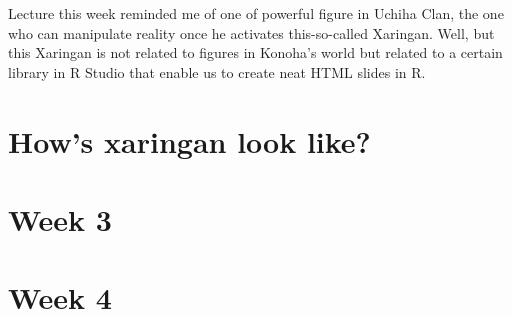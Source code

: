 \documentclass[
  letterpaper,
  DIV=11,
  numbers=noendperiod]{scrreprt}
\begin{document}
Lecture this week reminded me of one of powerful figure in Uchiha Clan,
the one who can manipulate reality once he activates this-so-called
Xaringan. Well, but this Xaringan is not related to figures in Konoha's
world but related to a certain library in R Studio that enable us to
create neat HTML slides in R.


\hypertarget{hows-xaringan-look-like}{%
\chapter{How's xaringan look like?}\label{hows-xaringan-look-like}}


\hypertarget{week-3}{%
\chapter{Week 3}\label{week-3}}


\hypertarget{week-4}{%
\chapter{Week 4}\label{week-4}}
\end{document}
